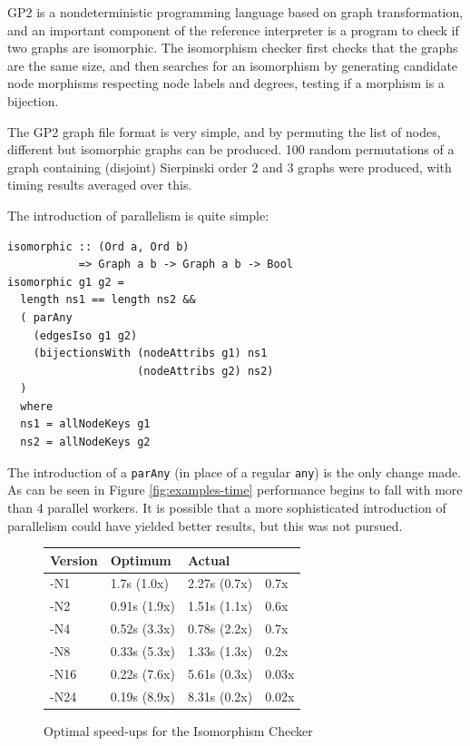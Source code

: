 GP2\cite{gp2} is a nondeterministic programming language based on
graph transformation, and an important component of the reference
interpreter is a program to check if two graphs are isomorphic. The
isomorphism checker first checks that the graphs are the same size,
and then searches for an isomorphism by generating candidate node
morphisms respecting node labels and degrees, testing if a morphism is
a bijection.

The GP2 graph file format is very simple, and by permuting the list of
nodes, different but isomorphic graphs can be produced. 100 random
permutations of a graph containing (disjoint) Sierpinski order 2 and 3
graphs were produced, with timing results averaged over this.

The introduction of parallelism is quite simple:

\begin{verbatim}
isomorphic :: (Ord a, Ord b)
           => Graph a b -> Graph a b -> Bool
isomorphic g1 g2 =
  length ns1 == length ns2 &&
  ( parAny
    (edgesIso g1 g2)
    (bijectionsWith (nodeAttribs g1) ns1
                    (nodeAttribs g2) ns2)
  )
  where
  ns1 = allNodeKeys g1
  ns2 = allNodeKeys g2
\end{verbatim}

The introduction of a \verb|parAny| (in place of a regular \verb|any|)
is the only change made. As can be seen in Figure
\ref{fig:examples-time} performance begins to fall with more than 4
parallel workers. It is possible that a more sophisticated
introduction of parallelism could have yielded better results, but
this was not pursued.

\begin{figure}[t]
  \centering
  \begin{tabularx}{\linewidth}{|X|X|X|X|}
    \hline \textbf{Version} & \textbf{Optimum} & \textbf{Actual} & \\
    \hline -N1  & 1.7s  (1.0x) & 2.27s (0.7x) & 0.7x \\
           -N2  & 0.91s (1.9x) & 1.51s (1.1x) & 0.6x \\
           -N4  & 0.52s (3.3x) & 0.78s (2.2x) & 0.7x \\
           -N8  & 0.33s (5.3x) & 1.33s (1.3x) & 0.2x \\
           -N16 & 0.22s (7.6x) & 5.61s (0.3x) & 0.03x \\
           -N24 & 0.19s (8.9x) & 8.31s (0.2x) & 0.02x \\
    \hline
  \end{tabularx}
  \caption{Optimal speed-ups for the Isomorphism Checker}
  \label{fig:examples-isos-amdahl}
\end{figure}


